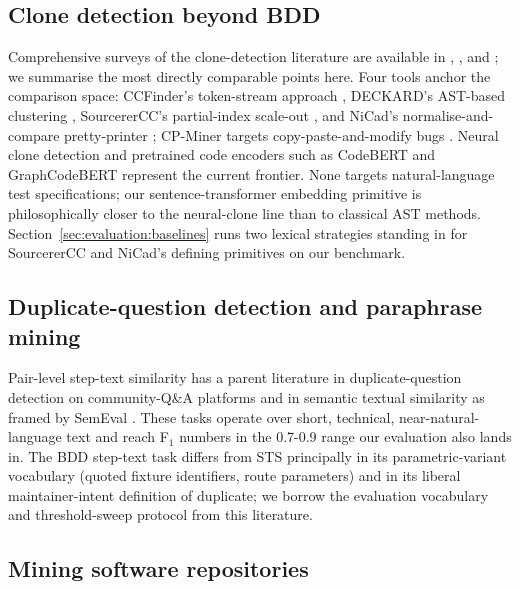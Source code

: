 \documentclass[11pt,a4paper]{article}
\begin{document}
\subsection{Clone detection beyond BDD}

Comprehensive surveys of the clone-detection literature are
available in \citet{roy2007survey}, \citet{rattan2013clonesurvey},
and \citet{kim2018cloneworld}; we summarise the most directly
comparable points here. Four tools anchor the comparison space: CCFinder's token-stream
approach \citep{kamiya2002ccfinder}, DECKARD's AST-based clustering
\citep{jiang2007deckard}, SourcererCC's partial-index scale-out
\citep{sajnani2016sourcerercc}, and NiCad's normalise-and-compare
pretty-printer \citep{cordy2011nicad}; CP-Miner targets
copy-paste-and-modify bugs \citep{li2004cpminer}. Neural clone
detection \citep{white2016deep,mou2016treelstm,zhang2019tbcc} and
pretrained code encoders such as CodeBERT
\citep{feng2020codebert} and GraphCodeBERT
\citep{guo2021graphcodebert} represent the current frontier. None
targets natural-language test specifications; our
sentence-transformer embedding primitive is philosophically
closer to the neural-clone line than to classical AST methods.
Section~\ref{sec:evaluation:baselines} runs two lexical strategies
standing in for SourcererCC and NiCad's defining primitives on our
benchmark.

\subsection{Duplicate-question detection and paraphrase mining}
\label{sec:related:paraphrase}

Pair-level step-text similarity has a parent literature in
duplicate-question detection on community-Q\&A platforms
\citep{zhang2018sodupes,mizobuchi2017sodupes,wang2017quora} and in
semantic textual similarity as framed by SemEval
\citep{agirre2016semeval}. These tasks operate over short,
technical, near-natural-language text and reach F$_1$ numbers in the
0.7-0.9 range our evaluation also lands in. The BDD step-text task
differs from STS principally in its parametric-variant vocabulary
(quoted fixture identifiers, route parameters) and in its liberal
maintainer-intent definition of duplicate; we borrow the evaluation
vocabulary and threshold-sweep protocol from this literature.

\subsection{Mining software repositories}
\end{document}
